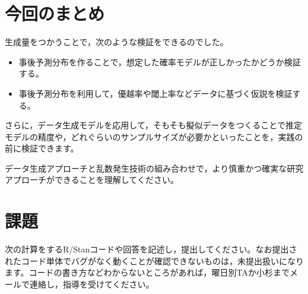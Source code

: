 \documentclass{ltjsbook}
\begin{document}
\section{今回のまとめ}
生成量をつかうことで，次のような検証をできるのでした。
\begin{itemize}
    \item 事後予測分布を作ることで，想定した確率モデルが正しかったかどうか検証する。
    \item 事後予測分布を利用して，優越率や閾上率などデータに基づく仮説を検証する。
\end{itemize}
さらに，データ生成モデルを応用して，そもそも擬似データをつくることで推定モデルの精度や，どれぐらいのサンプルサイズが必要かといったことを，実践の前に検証できます。

データ生成アプローチと乱数発生技術の組み合わせで，より慎重かつ確実な研究アプローチができることを理解してください。

\section{課題}
次の計算をするR/Stanコードや回答を記述し，提出してください。なお提出されたコード単体でバグがなく動くことが確認できないものは，未提出扱いになります。コードの書き方などわからないところがあれば，曜日別TAか小杉までメールで連絡し，指導を受けてください。
\end{document}
